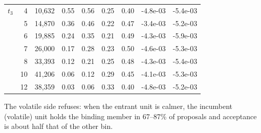 \begin{table}
\begin{tabular}{lrrrrrrrr}
$t_3$ & 4 & 10,632 & 0.55 & 0.56 & 0.25 & 0.40 & -4.8e-03 & -5.4e-03 \\
 & 5 & 14,870 & 0.36 & 0.46 & 0.22 & 0.47 & -3.4e-03 & -5.2e-03 \\
 & 6 & 19,885 & 0.24 & 0.35 & 0.21 & 0.49 & -4.3e-03 & -5.9e-03 \\
 & 7 & 26,000 & 0.17 & 0.28 & 0.23 & 0.50 & -4.6e-03 & -5.3e-03 \\
 & 8 & 33,393 & 0.12 & 0.21 & 0.25 & 0.48 & -4.3e-03 & -5.4e-03 \\
 & 10 & 41,206 & 0.06 & 0.12 & 0.29 & 0.45 & -4.1e-03 & -5.3e-03 \\
 & 12 & 38,359 & 0.03 & 0.06 & 0.33 & 0.40 & -4.8e-03 & -5.2e-03 \\
\bottomrule
\end{tabular}
\par\smallskip\begin{minipage}{0.95\linewidth}\footnotesize The volatile side refuses: when the entrant unit is calmer, the incumbent (volatile) unit holds the binding member in 67--87\% of proposals and acceptance is about half that of the other bin.\end{minipage}
\end{table}
